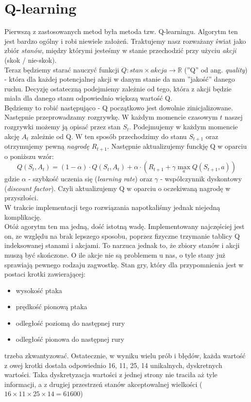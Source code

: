 \documentclass[12pt, A4]{article}
\begin{document}
\section{Q-learning}
Pierwszą z zastosowanych metod była metoda tzw. Q-learningu. Algorytm ten jest bardzo ogólny i robi niewiele założeń. Traktujemy nasz rozważany świat jako zbiór \textit{stanów}, między którymi jesteśmy w stanie przechodzić przy użyciu \textit{akcji} (skok / nie-skok).  \\
	Teraz będziemy starać nauczyć funkcji $Q: stan \times akcja \rightarrow \mathbb{R}$ (''Q'' od ang. \textit{quality}) - która dla każdej potencjalnej akcji w danym stanie da nam ''jakość'' danego ruchu. Decyzję ostateczną podejmiemy zależnie od tego, która z akcji będzie miała dla danego stanu odpowiednio większą wartość Q. \\	
	Będziemy to robić następująco - Q początkowo jest dowolnie zinicjalizowane. Następnie przeprowadzamy rozgrywkę. W każdym momencie czasowym $t$ naszej rozgrywki możemy ją opisać przez stan $S_t$. Podejmujemy w każdym momencie akcję $A_t$ zależnie od Q. W ten sposób przechodzimy do stanu $S_{t+1}$ oraz otrzymujemy pewną \textit{nagrodę} $R_{t+1}$. Następnie aktualizujemy funckję Q w oparciu o poniższu wzór:
	\[	Q(S_t, A_t) = (1-\alpha)\cdot Q(S_t, A_t) + \alpha \cdot \left( R_{t+1} + \gamma \max_a Q(S_{t+1}, a) \right)	\]
	gdzie $\alpha$ - szybkość uczenia się (\textit{learning rate}) oraz $\gamma$ - współczynnik dyskontowy (\textit{discount factor}).
	Czyli aktualizujemy Q w oparciu o oczekiwaną nagrodę w przyszłości. \\
	W trakcie implementacji tego rozwiązania napotkaliśmy jednak niejedną komplikację. \\

	Otóż agorytm ten ma jedną, dość istotną wadę. Implementowany najczęściej jest on, ze względu na brak lepszego sposobu, poprzez fizyczne trzymanie tablicy Q indeksowanej stanami i akcjami. To narzuca jednak to, że zbiory stanów i akcji muszą być skończone. O ile akcje nie są problemem u nas, o tyle stany już sprawiają pewnego rodzaju zagwostkę. Stan gry, który dla przypomnienia jest w postaci krotki zawierającej:
	\begin{itemize} 
	\item wysokość ptaka
	\item prędkość pionową ptaka
	\item	odległość poziomą do następnej rury
	\item odległość pionowa do następnej rury
	\end{itemize}
	trzeba zkwantyzować. Ostatecznie, w wyniku wielu prób i błędów, każda wartość z owej krotki dostała odpowiednio 16, 11, 25, 14 unikalnych, dyskretnych wartości. Taka dyskretyzacja wartości z jednej strony nie traciła aż tyle informacji, a z drugiej przestrzeń stanów akceptowalnej wielkości ($16\times11\times25\times14 = 61600$)\\
\end{document}
